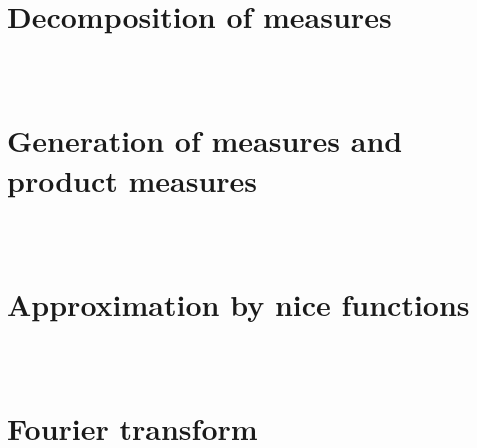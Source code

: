 \documentclass{beamer}
\numberwithin{equation}{section}
\begin{document}
\begin{frame}\frametitle{{\normalsize \secname} \\ {\large \subsecname}}
\end{frame}

\begin{frame}\frametitle{{\normalsize \secname} \\ {\large \subsecname}}
\end{frame}

\begin{frame}\frametitle{{\normalsize \secname} \\ {\large \subsecname}}
\end{frame}

\begin{frame}\frametitle{{\normalsize \secname} \\ {\large \subsecname}}
\end{frame}

\begin{frame}\frametitle{{\normalsize \secname} \\ {\large \subsecname}}
\end{frame}

\begin{frame}\frametitle{{\normalsize \secname} \\ {\large \subsecname}}
\end{frame}

\begin{frame}\frametitle{{\normalsize \secname} \\ {\large \subsecname}}
\end{frame}
\section{Decomposition of measures}

\begin{frame}\frametitle{{\normalsize \secname} \\ {\large \subsecname}}
\end{frame}

\section{Generation of measures and product measures}

\begin{frame}\frametitle{{\normalsize \secname} \\ {\large \subsecname}}
\end{frame}

\section{Approximation by nice functions}

\begin{frame}\frametitle{{\normalsize \secname} \\ {\large \subsecname}}
\end{frame}

\section{Fourier transform}

\begin{frame}\frametitle{{\normalsize \secname} \\ {\large \subsecname}}
\end{frame}
\end{document}
